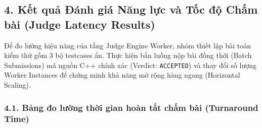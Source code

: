 \documentclass[12pt,a4paper]{article}
\renewcommand{\_}{\BreakableUnderscore}
\begin{document}
\subsection{4. Kết quả Đánh giá Năng lực và Tốc độ Chấm bài (Judge Latency Results)}

Để đo lường hiệu năng của tầng Judge Engine Worker, nhóm thiết lập bài toán kiểm thử gồm 3 bộ testcases ẩn. Thực hiện bắn luồng nộp bài đồng thời (Batch Submissions) mã nguồn C++ chính xác (Verdict: \texttt{ACCEPTED}) và thay đổi số lượng Worker Instances để chứng minh khả năng mở rộng hàng ngang (Horizontal Scaling).

\subsubsection{4.1. Bảng đo lường thời gian hoàn tất chấm bài (Turnaround Time)}
\end{document}
